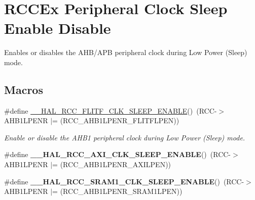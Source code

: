 \hypertarget{group___r_c_c_ex___peripheral___clock___sleep___enable___disable}{}\section{R\+C\+C\+Ex Peripheral Clock Sleep Enable Disable}
\label{group___r_c_c_ex___peripheral___clock___sleep___enable___disable}


Enables or disables the A\+H\+B/\+A\+PB peripheral clock during Low Power (Sleep) mode.  


\subsection*{Macros}
\begin{DoxyCompactItemize}
\item 
\mbox{\label{group___r_c_c_ex___peripheral___clock___sleep___enable___disable_ga13e370f94b39c72876a321cdc5b31915}} 
\#define \mbox{\hyperlink{group___r_c_c_ex___peripheral___clock___sleep___enable___disable_ga13e370f94b39c72876a321cdc5b31915}{\+\_\+\+\_\+\+H\+A\+L\+\_\+\+R\+C\+C\+\_\+\+F\+L\+I\+T\+F\+\_\+\+C\+L\+K\+\_\+\+S\+L\+E\+E\+P\+\_\+\+E\+N\+A\+B\+LE}}()~(R\+CC-\/$>$A\+H\+B1\+L\+P\+E\+NR $\vert$= (R\+C\+C\+\_\+\+A\+H\+B1\+L\+P\+E\+N\+R\+\_\+\+F\+L\+I\+T\+F\+L\+P\+EN))
\begin{DoxyCompactList}\small\item\em Enable or disable the A\+H\+B1 peripheral clock during Low Power (Sleep) mode. \end{DoxyCompactList}\item 
\mbox{\label{group___r_c_c_ex___peripheral___clock___sleep___enable___disable_ga6f8081c628233d5adef1f81c19eb4d62}} 
\#define {\bfseries \+\_\+\+\_\+\+H\+A\+L\+\_\+\+R\+C\+C\+\_\+\+A\+X\+I\+\_\+\+C\+L\+K\+\_\+\+S\+L\+E\+E\+P\+\_\+\+E\+N\+A\+B\+LE}()~(R\+CC-\/$>$A\+H\+B1\+L\+P\+E\+NR $\vert$= (R\+C\+C\+\_\+\+A\+H\+B1\+L\+P\+E\+N\+R\+\_\+\+A\+X\+I\+L\+P\+EN))
\item 
\mbox{\label{group___r_c_c_ex___peripheral___clock___sleep___enable___disable_ga94b6e96c9d5058f9bf0e0c1aaf19ab37}} 
\#define {\bfseries \+\_\+\+\_\+\+H\+A\+L\+\_\+\+R\+C\+C\+\_\+\+S\+R\+A\+M1\+\_\+\+C\+L\+K\+\_\+\+S\+L\+E\+E\+P\+\_\+\+E\+N\+A\+B\+LE}()~(R\+CC-\/$>$A\+H\+B1\+L\+P\+E\+NR $\vert$= (R\+C\+C\+\_\+\+A\+H\+B1\+L\+P\+E\+N\+R\+\_\+\+S\+R\+A\+M1\+L\+P\+EN))

\end{DoxyCompactItemize}
